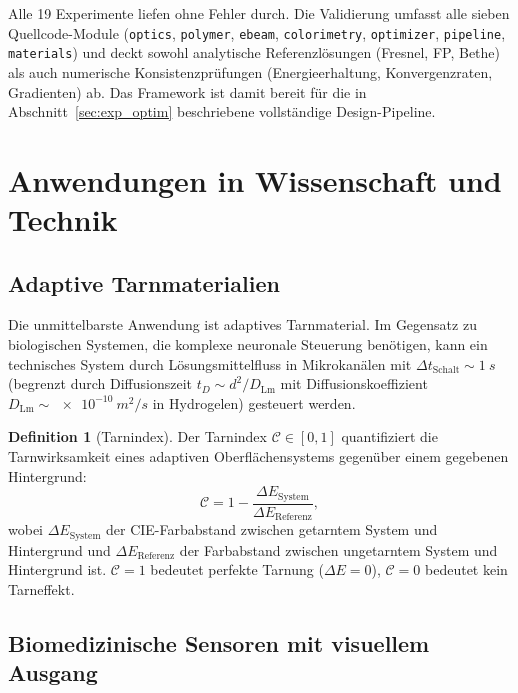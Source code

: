 ﻿\documentclass[a4paper,12pt]{article}
\theoremstyle{definition}
\newtheorem{definition}{Definition}[section]
\begin{document}
	Alle 19 Experimente liefen ohne Fehler durch.  Die Validierung umfasst
	alle sieben Quellcode-Module (\texttt{optics}, \texttt{polymer},
	\texttt{ebeam}, \texttt{colorimetry}, \texttt{optimizer},
	\texttt{pipeline}, \texttt{materials}) und deckt sowohl analytische
	Referenzlösungen (Fresnel, FP, Bethe) als auch numerische
	Konsistenzprüfungen (Energieerhaltung, Konvergenzraten, Gradienten)
	ab.  Das Framework ist damit bereit für die in Abschnitt~\ref{sec:exp_optim}
	beschriebene vollständige Design-Pipeline.
	
	
	\section{Anwendungen in Wissenschaft und Technik}
	\label{sec:anwendungen}
	
	\subsection{Adaptive Tarnmaterialien}
	
	Die unmittelbarste Anwendung ist adaptives Tarnmaterial. Im Gegensatz zu
	biologischen Systemen, die komplexe neuronale Steuerung benötigen, kann ein
	technisches System durch Lösungsmittelfluss in Mikrokanälen mit
	$\Delta t_\mathrm{Schalt} \sim \SI{1}{s}$ (begrenzt durch
	Diffusionszeit $t_D \sim d^2/D_\mathrm{Lm}$ mit Diffusionskoeffizient
	$D_\mathrm{Lm} \sim \SI{e-10}{m^2/s}$ in Hydrogelen) gesteuert werden.
	
	\begin{definition}[Tarnindex]
		\label{def:tarnindex}
		Der Tarnindex $\mathcal{C} \in [0,1]$ quantifiziert die Tarnwirksamkeit
		eines adaptiven Oberflächensystems gegenüber einem gegebenen Hintergrund:
		\begin{equation}
			\mathcal{C} = 1 - \frac{\Delta E_\mathrm{System}}{\Delta E_\mathrm{Referenz}},
			\label{eq:tarnindex}
		\end{equation}
		wobei $\Delta E_\mathrm{System}$ der CIE-Farbabstand zwischen getarntem
		System und Hintergrund und $\Delta E_\mathrm{Referenz}$ der Farbabstand
		zwischen ungetarntem System und Hintergrund ist.
		$\mathcal{C} = 1$ bedeutet perfekte Tarnung ($\Delta E = 0$),
		$\mathcal{C} = 0$ bedeutet kein Tarneffekt.
	\end{definition}
	
	\subsection{Biomedizinische Sensoren mit visuellem Ausgang}
	
\end{document}
